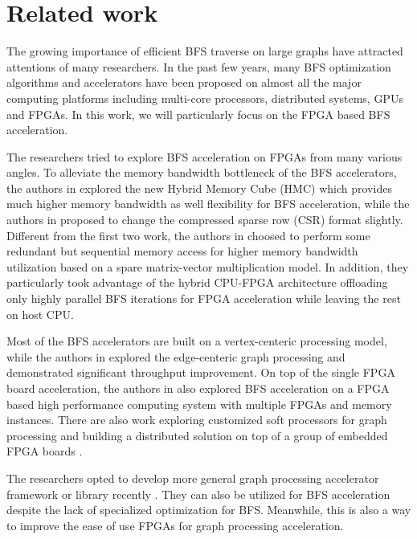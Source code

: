 \section{Related work} \label{sec:relatedwork}
The growing importance of efficient BFS traverse on large graphs 
have attracted attentions of many researchers. In the past few years, 
many BFS optimization algorithms and accelerators have been proposed 
on almost all the major computing platforms including multi-core processors, 
distributed systems, GPUs and FPGAs. In this work, we will 
particularly focus on the FPGA based BFS acceleration. 

The researchers tried to explore BFS acceleration 
on FPGAs from many various angles.
To alleviate the memory bandwidth bottleneck of the 
BFS accelerators, the authors in \cite{zhang2017boosting, khoram2018accelerating} 
explored the new Hybrid Memory Cube (HMC) which provides 
much higher memory bandwidth as well flexibility for BFS 
acceleration, while the authors in \cite{attia2014cygraph} 
proposed to change the compressed sparse row (CSR) format slightly. 
Different from the first two work, the authors in \cite{umuroglu2015hybrid} 
choosed to perform some redundant but sequential memory access for higher memory bandwidth 
utilization based on a spare matrix-vector multiplication model.
In addition, they particularly took advantage of the 
hybrid CPU-FPGA architecture offloading only highly parallel 
BFS iterations for FPGA acceleration while leaving the rest 
on host CPU.  

Most of the BFS accelerators are built on a vertex-centeric 
processing model, while the authors 
in \cite{zhou2016high} explored the edge-centeric graph processing and demonstrated 
significant throughput improvement. On top of the single FPGA board acceleration, 
the authors in \cite{attia2014cygraph, betkaoui2012reconfigurable} also explored 
BFS acceleration on a FPGA based high performance computing system with multiple 
FPGAs and memory instances. There are also work exploring customized soft processors 
for graph processing and building a distributed solution on 
top of a group of embedded FPGA boards \cite{kapre2015custom, wang2010message}.

The researchers opted to develop 
more general graph processing accelerator framework or library 
recently \cite{engelhardt2016gravf, jun2018grafboost, yao2018efficient, oguntebi2016graphops, Dai2017foregraph, dai2016fpgp}. 
They can also be utilized for BFS acceleration despite the lack of 
specialized optimization for BFS. Meanwhile, this is also a way to improve 
the ease of use FPGAs for graph processing acceleration.


